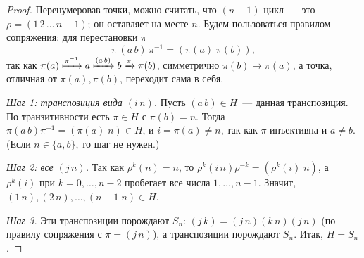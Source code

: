 \begin{proof}
Перенумеровав точки, можно считать, что $(n-1)$-цикл~--- это $\rho=(1\,2\,\dots\,n{-}1)$; он оставляет на месте $n$. Будем
пользоваться правилом сопряжения: для перестановки $\pi$
\[
\pi\,(a\,b)\,\pi^{-1}=(\pi(a)\;\pi(b)),
\]
так как $\pi(a)\xmapsto{\pi^{-1}}a\xmapsto{(a\,b)}b\xmapsto{\pi}\pi(b)$, симметрично $\pi(b)\mapsto\pi(a)$, а точка, отличная
от $\pi(a),\pi(b)$, переходит сама в себя.

\emph{Шаг 1: транспозиция вида $(i\,n)$.} Пусть $(a\,b)\in H$~--- данная транспозиция. По транзитивности есть $\pi\in H$ с
$\pi(b)=n$. Тогда $\pi(a\,b)\pi^{-1}=(\pi(a)\;n)\in H$, и $i=\pi(a)\ne n$, так как $\pi$ инъективна и $a\ne b$. (Если
$n\in\{a,b\}$, то шаг не нужен.)

\emph{Шаг 2: все $(j\,n)$.} Так как $\rho^k(n)=n$, то $\rho^k(i\,n)\rho^{-k}=(\rho^k(i)\;n)$, а $\rho^k(i)$ при $k=0,\dots,n-2$
пробегает все числа $1,\dots,n-1$. Значит, $(1\,n),(2\,n),\dots,(n-1\;n)\in H$.

\emph{Шаг 3.} Эти транспозиции порождают $S_n$: $(j\,k)=(j\,n)(k\,n)(j\,n)$ (по правилу сопряжения с $\pi=(j\,n)$), а
транспозиции порождают $S_n$. Итак, $H=S_n$.
\end{proof}

